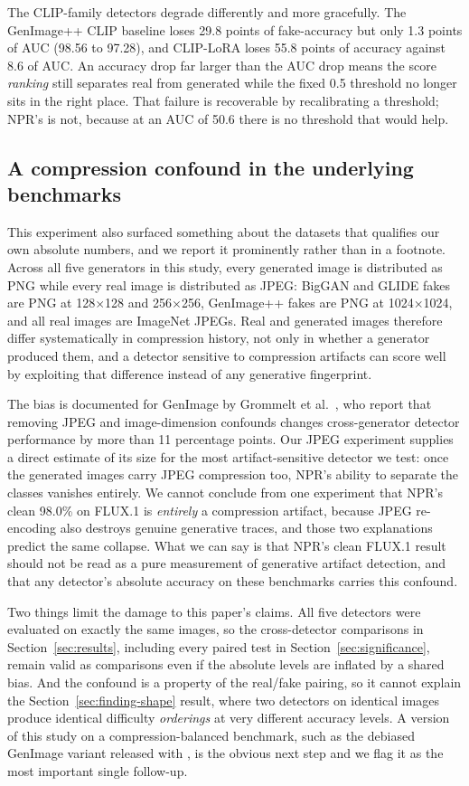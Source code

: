 \documentclass[3p,times,procedia]{elsarticle}
\begin{document}
The CLIP-family detectors degrade differently and more gracefully. The
GenImage++ CLIP baseline loses 29.8 points of fake-accuracy but only 1.3
points of AUC (98.56 to 97.28), and CLIP-LoRA loses 55.8 points of accuracy
against 8.6 of AUC. An accuracy drop far larger than the AUC drop means the
score \emph{ranking} still separates real from generated while the fixed
0.5 threshold no longer sits in the right place. That failure is
recoverable by recalibrating a threshold; NPR's is not, because at an AUC
of 50.6 there is no threshold that would help.

\subsection{A compression confound in the underlying benchmarks}
\label{sec:jpeg-confound}

This experiment also surfaced something about the datasets that qualifies
our own absolute numbers, and we report it prominently rather than in a
footnote. Across all five generators in this study, every generated image
is distributed as PNG while every real image is distributed as JPEG: BigGAN
and GLIDE fakes are PNG at 128$\times$128 and 256$\times$256, GenImage++
fakes are PNG at 1024$\times$1024, and all real images are ImageNet JPEGs.
Real and generated images therefore differ systematically in compression
history, not only in whether a generator produced them, and a detector
sensitive to compression artifacts can score well by exploiting that
difference instead of any generative fingerprint.

The bias is documented for GenImage by Grommelt et
al.~\cite{grommelt2024jpeg}, who report that removing JPEG and
image-dimension confounds changes cross-generator detector performance by
more than 11 percentage points. Our JPEG experiment supplies a direct
estimate of its size for the most artifact-sensitive detector we test: once
the generated images carry JPEG compression too, NPR's ability to separate
the classes vanishes entirely. We cannot conclude from one experiment that
NPR's clean 98.0\% on FLUX.1 is \emph{entirely} a compression artifact,
because JPEG re-encoding also destroys genuine generative traces, and those
two explanations predict the same collapse. What we can say is that NPR's
clean FLUX.1 result should not be read as a pure measurement of generative
artifact detection, and that any detector's absolute accuracy on these
benchmarks carries this confound.

Two things limit the damage to this paper's claims. All five detectors were
evaluated on exactly the same images, so the cross-detector comparisons in
Section~\ref{sec:results}, including every paired test in
Section~\ref{sec:significance}, remain valid as comparisons even if the
absolute levels are inflated by a shared bias. And the confound is a
property of the real/fake pairing, so it cannot explain the
Section~\ref{sec:finding-shape} result, where two detectors on identical
images produce identical difficulty \emph{orderings} at very different
accuracy levels. A version of this study on a compression-balanced
benchmark, such as the debiased GenImage variant released with
\cite{grommelt2024jpeg}, is the obvious next step and we flag it as the
most important single follow-up.
\end{document}
